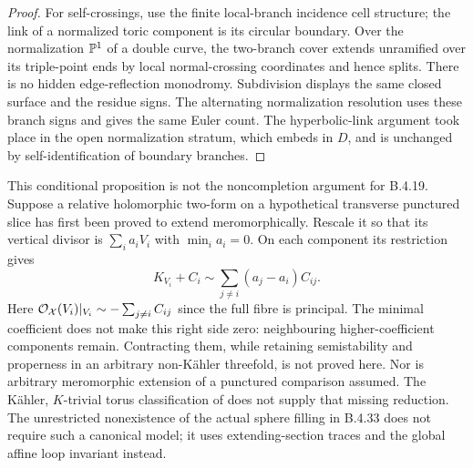 \begin{proof}
For self-crossings, use the finite local-branch
incidence cell structure; the link of a normalized
toric component is its circular boundary. Over the
normalization $\mathbb P^1$ of a double curve, the two-branch
cover extends unramified over its triple-point ends
by local normal-crossing coordinates and hence splits.
There is no hidden edge-reflection monodromy. Subdivision
displays the same closed surface and the residue signs.
The alternating normalization resolution uses these
branch signs and gives the same Euler count. The
hyperbolic-link argument took place in the open
normalization stratum, which embeds in $D$, and is
unchanged by self-identification of boundary branches.
\end{proof}

\begin{remark}
This conditional proposition is not the noncompletion
argument for B.4.19. Suppose a relative holomorphic two-form
on a hypothetical transverse punctured slice has first
been proved to extend meromorphically. Rescale it so
that its vertical divisor is $\sum_i a_iV_i$ with
$\min_i a_i=0$. On each component its restriction gives
\[
 K_{V_i}+C_i\sim\sum_{j\ne i}(a_j-a_i)C_{ij}.          \tag{B.4.28.11}
\]
Here $\mathcal O_{\mathcal X}(V_i)|_{V_i}\sim
-\sum_{j\ne i}C_{ij}$ since the full fibre is principal.
The minimal coefficient does not make this right side
zero: neighbouring higher-coefficient components remain.
Contracting them, while retaining semistability and
properness in an arbitrary non-K\"ahler threefold, is
not proved here. Nor is arbitrary meromorphic extension
of a punctured comparison assumed. The K\"ahler,
$K$-trivial torus classification of
\citet[Theorem 3.1]{KamenovaToriRoot} does not supply
that missing reduction. The unrestricted nonexistence
of the actual sphere filling in B.4.33 does not require
such a canonical model; it uses extending-section traces
and the global affine loop invariant instead.
\end{remark}

